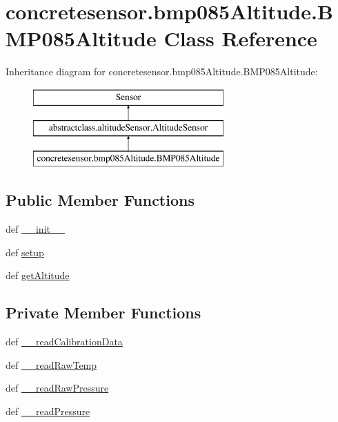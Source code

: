 \hypertarget{classconcretesensor_1_1bmp085Altitude_1_1BMP085Altitude}{}\section{concretesensor.\+bmp085\+Altitude.\+B\+M\+P085\+Altitude Class Reference}
\label{classconcretesensor_1_1bmp085Altitude_1_1BMP085Altitude}
Inheritance diagram for concretesensor.\+bmp085\+Altitude.\+B\+M\+P085\+Altitude\+:\begin{figure}[H]
\begin{center}
\leavevmode
\includegraphics[height=3.000000cm]{classconcretesensor_1_1bmp085Altitude_1_1BMP085Altitude}
\end{center}
\end{figure}
\subsection*{Public Member Functions}
\begin{DoxyCompactItemize}
\item 
def \hyperlink{classconcretesensor_1_1bmp085Altitude_1_1BMP085Altitude_a6cd7590bf5dcd5b33f01f6f7583ffac9}{\+\_\+\+\_\+init\+\_\+\+\_\+}
\item 
def \hyperlink{classconcretesensor_1_1bmp085Altitude_1_1BMP085Altitude_a4946974d96ec1061edf2655d1e364a82}{setup}
\item 
def \hyperlink{classconcretesensor_1_1bmp085Altitude_1_1BMP085Altitude_ab602c4b403a8e188876cb57bc7631f26}{get\+Altitude}
\end{DoxyCompactItemize}
\subsection*{Private Member Functions}
\begin{DoxyCompactItemize}
\item 
def \hyperlink{classconcretesensor_1_1bmp085Altitude_1_1BMP085Altitude_a5f5eccdef114c2062d154a8225f04889}{\+\_\+\+\_\+read\+Calibration\+Data}
\item 
def \hyperlink{classconcretesensor_1_1bmp085Altitude_1_1BMP085Altitude_a9e46b685a6d47fdc57c57b213ffe102a}{\+\_\+\+\_\+read\+Raw\+Temp}
\item 
def \hyperlink{classconcretesensor_1_1bmp085Altitude_1_1BMP085Altitude_a8a89520997ffc7550815c7721b50797c}{\+\_\+\+\_\+read\+Raw\+Pressure}
\item 
def \hyperlink{classconcretesensor_1_1bmp085Altitude_1_1BMP085Altitude_ae3cbf2b2224e10f7cb8001de91869ce9}{\+\_\+\+\_\+read\+Pressure}
\end{DoxyCompactItemize}
